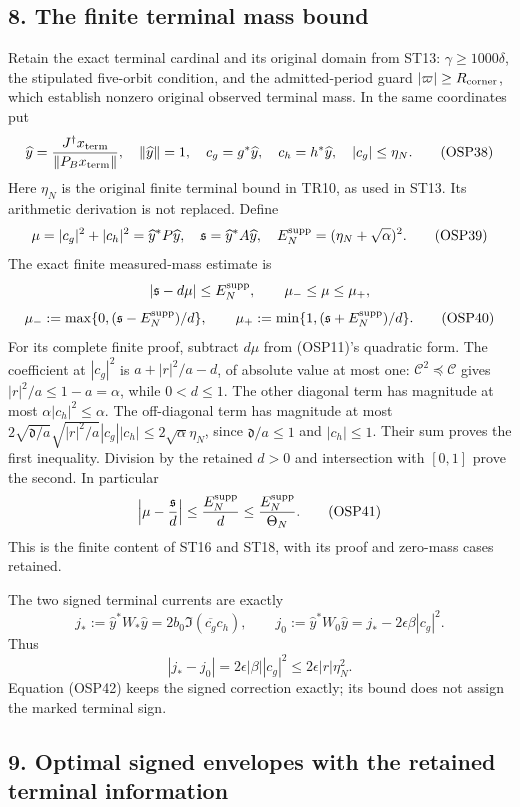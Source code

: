 \documentclass[
]{article}
\begin{document}
\subsection{8. The finite terminal mass
bound}\label{the-finite-terminal-mass-bound}

Retain the exact terminal cardinal and its original domain from ST13:
\(\gamma\ge1000\delta\), the stipulated five-orbit condition, and the
admitted-period guard \(|\varpi|\ge R_{\rm corner}\), which establish
nonzero original observed terminal mass. In the same coordinates put \[
\widehat y=\frac{J^\dagger x_{\rm term}}{\|P_Bx_{\rm term}\|},
\quad\|\widehat y\|=1,\quad
c_g=g^*\widehat y,\quad c_h=h^*\widehat y,
\quad |c_g|\le\eta_N.
\tag{OSP38}
\] Here \(\eta_N\) is the original finite terminal bound in TR10, as
used in ST13. Its arithmetic derivation is not replaced. Define \[
\mu=|c_g|^2+|c_h|^2=\widehat y^*P\widehat y,
\quad\mathfrak s=\widehat y^*A\widehat y,
\quad E_N^{\rm supp}=(\eta_N+\sqrt\alpha)^2.
\tag{OSP39}
\] The exact finite measured-mass estimate is \[
|\mathfrak s-d\mu|\le E_N^{\rm supp},\qquad
\mu_-\le\mu\le\mu_+,
\] \[
\mu_-:=\max\{0,(\mathfrak s-E_N^{\rm supp})/d\},\qquad
\mu_+:=\min\{1,(\mathfrak s+E_N^{\rm supp})/d\}.
\tag{OSP40}
\] For its complete finite proof, subtract \(d\mu\) from (OSP11)'s
quadratic form. The coefficient at \(|c_g|^2\) is \(a+|r|^2/a-d\), of
absolute value at most one: \(\mathcal C^2\preceq\mathcal C\) gives
\(|r|^2/a\le1-a=\alpha\), while \(0<d\le1\). The other diagonal term has
magnitude at most \(\alpha|c_h|^2\le\alpha\). The off-diagonal term has
magnitude at most
\(2\sqrt{\mathfrak d/a}\sqrt{|r|^2/a}|c_g||c_h|\le2\sqrt\alpha\eta_N\),
since \(\mathfrak d/a\le1\) and \(|c_h|\le1\). Their sum proves the
first inequality. Division by the retained \(d>0\) and intersection with
\([0,1]\) prove the second. In particular \[
\left|\mu-\frac{\mathfrak s}{d}\right|
\le\frac{E_N^{\rm supp}}d\le\frac{E_N^{\rm supp}}{\Theta_N}.
\tag{OSP41}
\] This is the finite content of ST16 and ST18, with its proof and
zero-mass cases retained.

The two signed terminal currents are exactly \[
j_*:=\widehat y^*W_*\widehat y
=2b_0\Im(\overline{c_g}c_h),\qquad
j_0:=\widehat y^*W_0\widehat y
=j_*-2\epsilon\beta|c_g|^2.
\tag{OSP42}
\] Thus \[
|j_*-j_0|=2\epsilon|\beta||c_g|^2
\le2\epsilon|r|\eta_N^2.
\tag{OSP43}
\] Equation (OSP42) keeps the signed correction exactly; its bound does
not assign the marked terminal sign.

\subsection{9. Optimal signed envelopes with the retained terminal
information}\label{optimal-signed-envelopes-with-the-retained-terminal-information}
\end{document}
